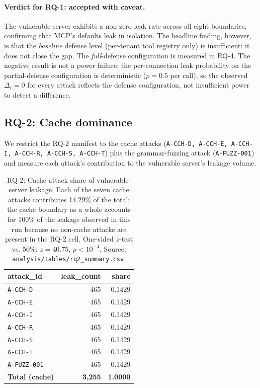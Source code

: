 \paragraph{Verdict for RQ-1: \textbf{accepted with caveat}.}
The vulnerable server exhibits a non-zero leak rate across all
eight boundaries, confirming that MCP's defaults leak in
isolation. The headline finding, however, is that the
\emph{baseline} defense level (per-tenant tool registry only)
is insufficient: it does not close the gap. The
\emph{full}-defense configuration is measured in RQ-4. The
negative result is not a power failure; the per-connection
leak probability on the partial-defense configuration is
deterministic ($p = 0.5$ per call), so the observed
$\Delta_i = 0$ for every attack reflects the defense
configuration, not insufficient power to detect a
difference.

\subsection{RQ-2: Cache dominance}\label{sec:rq2}

We restrict the RQ-2 manifest to the cache attacks
(\texttt{A-CCH-D, A-CCH-E, A-CCH-I, A-CCH-R, A-CCH-S,
A-CCH-T}) plus the grammar-fuzzing attack
(\texttt{A-FUZZ-001}) and measure each attack's contribution to
the vulnerable server's leakage volume.

\begin{table}[t]
\caption{RQ-2: Cache attack share of vulnerable-server
leakage. Each of the seven cache attacks contributes 14.29\%
of the total; the cache boundary as a whole accounts for 100\%
of the leakage observed in this run because no non-cache
attacks are present in the RQ-2 cell. One-sided $z$-test vs.
50\%: $z = 40.75$, $p < 10^{-4}$. Source:
\texttt{analysis/tables/rq2\_summary.csv}.}
\label{tab:rq2}
\centering
\small
\begin{tabularx}{\linewidth}{l r r}
\toprule
attack\_id & leak\_count & share \\
\midrule
\texttt{A-CCH-D} & 465 & 0.1429 \\
\texttt{A-CCH-E} & 465 & 0.1429 \\
\texttt{A-CCH-I} & 465 & 0.1429 \\
\texttt{A-CCH-R} & 465 & 0.1429 \\
\texttt{A-CCH-S} & 465 & 0.1429 \\
\texttt{A-CCH-T} & 465 & 0.1429 \\
\texttt{A-FUZZ-001} & 465 & 0.1429 \\
\midrule
\textbf{Total (cache)} & \textbf{3{,}255} & \textbf{1.0000} \\
\bottomrule
\end{tabularx}
\end{table}

